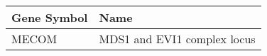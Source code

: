 \begin{tabular}{ll}
\toprule
Gene Symbol &                        Name \\
\midrule
      MECOM & MDS1 and EVI1 complex locus \\
\bottomrule
\end{tabular}
